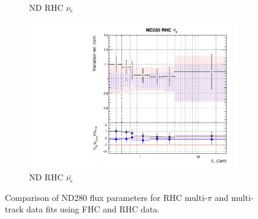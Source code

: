\begin{figure}[t]
\begin{subfigure}{0.42\textwidth}
  \caption{ND RHC $\nu_{e}$}
\end{subfigure}
\vspace{15mm}
\begin{subfigure}{0.42\textwidth}
  \centering
  \includegraphics[width=0.75\linewidth]{figs/rhcmpdat28flux_7}
  \caption{ND RHC $\bar{\nu_e}$}
\end{subfigure}
\caption{Comparison of ND280 flux parameters for RHC multi-$\pi$ and multi-track data fits using FHC and RHC data.}
\label{fig:rhcmpidat28ND}
\end{figure}

